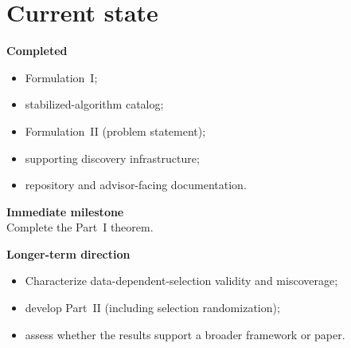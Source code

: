 \documentclass[11pt]{article}
\begin{document}
\section{Current state}

\begin{tcolorbox}[finalpanel]
\textbf{\color{navy}Completed}
\begin{itemize}
  \item Formulation~I;
  \item stabilized-algorithm catalog;
  \item Formulation~II (problem statement);
  \item supporting discovery infrastructure;
  \item repository and advisor-facing documentation.
\end{itemize}

\textbf{\color{navy}Immediate milestone}\\[1pt]
Complete the Part~I theorem.

\vspace{3pt}
\textbf{\color{navy}Longer-term direction}
\begin{itemize}
  \item Characterize data-dependent-selection validity and miscoverage;
  \item develop Part~II (including selection randomization);
  \item assess whether the results support a broader framework or paper.
\end{itemize}
\end{tcolorbox}
\end{document}
